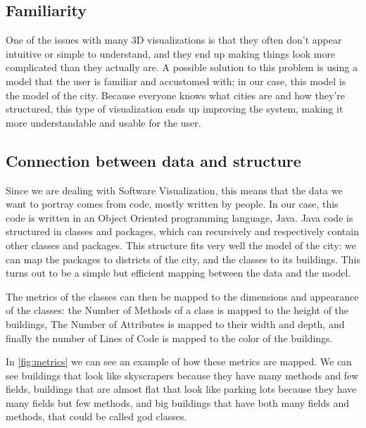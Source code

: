 \documentclass[]{usiinfbachelorproject}
\begin{document}
\subsection{Familiarity} \label{Familiarity}
One of the issues with many 3D visualizations is that they often don't appear intuitive or simple to understand, and they end up making things look more complicated than they actually are. A possible solution to this problem is using a model that the user is familiar and accustomed with; in our case, this model is the model of the city. Because everyone knows what cities are and how they're structured, this type of visualization ends up improving the system, making it more understandable and usable for the user.

\subsection{Connection between data and structure} \label{Connection between data and structure}
Since we are dealing with Software Visualization, this means that the data we want to portray comes from code, mostly written by people. In our case, this code is written in an Object Oriented programming language, Java.
Java code is structured in classes and packages, which can recursively and respectively contain other classes and packages.
This structure fits very well the model of the city: we can map the packages to districts of the city, and the classes to its buildings. This turns out to be a simple but efficient mapping between the data and the model.

The metrics of the classes can then be mapped to the dimensions and appearance of the classes:
the Number of Methods of a class is mapped to the height of the buildings, The Number of Attributes is mapped to their width and depth, and finally the number of Lines of Code is mapped to the color of the buildings.

In \ref{fig:metrics} we can see an example of how these metrics are mapped. We can see buildings that look like skyscrapers because they have many methods and few fields, buildings that are almost flat that look like parking lots because they have many fields but few methods, and big buildings that have both many fields and methods, that could be called god classes\cite{Riel1996}.
\end{document}
